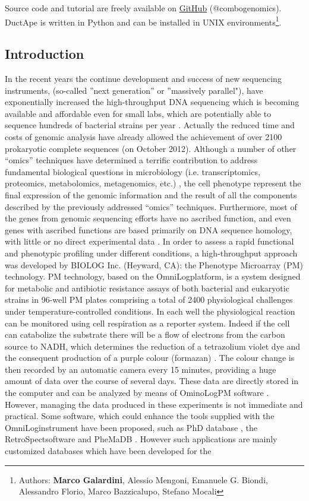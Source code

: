 Source code and tutorial are freely available on \href{http://combogenomics.github.com/DuctApe/}{GitHub} (@combogenomics). DuctApe is written in Python and can be installed in UNIX environments\footnote{Authors: \textbf{Marco Galardini}, Alessio Mengoni, Emanuele G. Biondi, Alessandro Florio, Marco Bazzicalupo, Stefano Mocali}.

\subsection{Introduction}
In the recent years the continue development and success of new sequencing instruments, (so-called ”next generation” or ”massively parallel"), have exponentially increased the high-throughput DNA sequencing which is becoming available and affordable even for small labs, which are potentially able to sequence hundreds of bacterial strains per year \cite{metzker2009sequencing}. Actually the reduced time and costs of genomic analysis have already allowed the achievement of over 2100 prokaryotic complete sequences (on October 2012). Although a number of other “omics” techniques have determined a terrific contribution to address fundamental biological questions in microbiology (i.e. transcriptomics, proteomics, metabolomics, metagenomics, etc.) \cite{zhang2010integrating}, the cell phenotype represent the final expression of the genomic information and the result of all the components described by the previously addressed “omics” techniques. Furthermore, most of the genes from genomic sequencing efforts have no ascribed function, and even genes with ascribed functions are based primarily on DNA sequence homology, with little or no direct experimental data \cite{mardis2008impact}. In order to assess a rapid functional and phenotypic profiling under different conditions, a high-throughput approach was developed by BIOLOG Inc. (Heyward, CA): the Phenotype Microarray (PM) technology. PM technology, based on the OmniLog\texttrademark platform, is a system designed for metabolic and antibiotic resistance assays of both bacterial and eukaryotic strains in 96-well PM plates comprising a total of 2400 physiological challenges under temperature-controlled conditions. In each well the physiological reaction can be monitored using cell respiration as a reporter system. Indeed if the cell can catabolize the substrate there will be a flow of electrons from the carbon source to NADH, which determines the reduction of a tetrazolium violet dye and the consequent production of a purple colour (formazan) \cite{bochner2001phenotype}. The colour change is then recorded by an automatic camera every 15 minutes, providing a huge amount of data over the course of several days. These data are directly stored in the computer and can be analyzed by means of OminoLog\texttrademark PM software \cite{biolog2009}. However, managing the data produced in these experiments is not immediate and practical. Some software, which could enhance the tools supplied with the OmniLog\texttrademark instrument have been proposed, such as PhD database \cite{li2005phd}, the RetroSpect\texttrademark software \cite{biolog2008} and PheMaDB \cite{wenling12phemadb}. However such applications are mainly customized databases which have been developed for the 